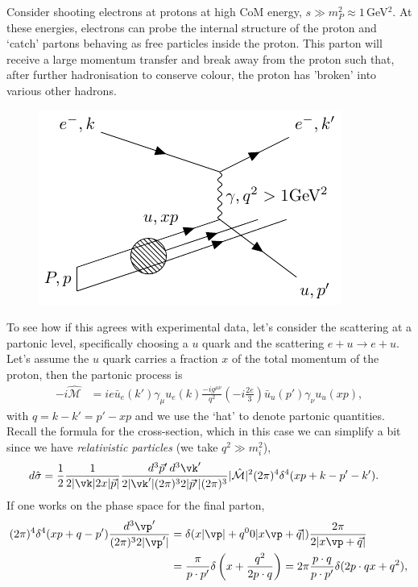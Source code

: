 \documentclass[a4paper, 11pt, normalem]{report}
\begin{document}
Consider shooting electrons at protons at high CoM energy, $s\gg m_P^2\approx 1\,$GeV$^2$.
At these energies, electrons can probe the internal structure of the proton and `catch' partons behaving as free particles inside the proton.
This parton will receive a large momentum transfer and break away from the proton such that, after further hadronisation to conserve colour, the proton has 'broken' into various other hadrons.
\begin{figure}[H]
    \centering
    \includegraphics[scale=1.2]{dis.pdf}
\end{figure}
To see how if this agrees with experimental data, let's consider the scattering at a partonic level, specifically choosing a $u$ quark and the scattering $e+u\to e+u$.
Let's assume the $u$ quark carries a fraction $x$ of the total momentum of the proton, then the partonic process is
\begin{align}
    -i\hat{\mathcal{M}} &= ie\bar{u}_e(k')\gamma_\mu u_e(k)\frac{-ig^{\mu\nu}}{q^2}\left(-i\frac{2e}{3}\right)\bar{u}_u(p')\gamma_\nu u_u(xp),
\end{align}
with $q=k-k'=p'-xp$ and we use the `hat' to denote partonic quantities.
Recall the formula for the cross-section, which in this case we can simplify a bit since we have \emph{relativistic particles} (we take $q^2\gg m_i^2$),
\begin{align}
    d\hat{\sigma} &= \frac12 \frac{1}{2|\vk|2x|\vec{p}|} \frac{d^3\vec{p}'\,d^3\vk'}{2|\vk'|(2\pi)^32|\vec{p}'|(2\pi)^3}|\hat{\mathcal{M}}|^2 (2\pi)^4 \delta^4(xp+k-p'-k').
\end{align}
If one works on the phase space for the final parton,
\begin{align}
    \begin{split}
        (2\pi)^4\delta^4(xp+q-p')\frac{d^3\vp'}{(2\pi)^32|\vp'|} &= \delta(x|\vp|+q^00|x\vp+\vec{q}|)\frac{2\pi}{2|x\vp+\vec{q}|} \\
                                                                 &= \frac{\pi}{p\cdot p'}\delta\left(x+\frac{q^2}{2p\cdot q}\right) = 2\pi\frac{p\cdot q}{p\cdot p'}\delta(2p\cdot qx + q^2),
    \end{split}
\end{align}
\end{document}
